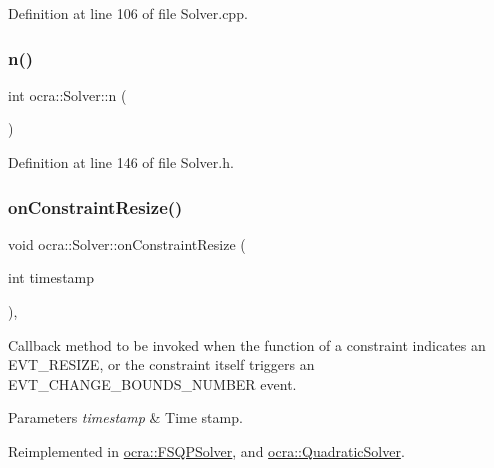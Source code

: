 Definition at line 106 of file Solver.\+cpp.

\hypertarget{classocra_1_1Solver_a63e73904de66df69372ed91c6b9d058b}{}\label{classocra_1_1Solver_a63e73904de66df69372ed91c6b9d058b} 
\subsubsection{\texorpdfstring{n()}{n()}}
{\footnotesize\ttfamily int ocra\+::\+Solver\+::n (\begin{DoxyParamCaption}{ }\end{DoxyParamCaption})\hspace{0.3cm}{\ttfamily [inline]}}



Definition at line 146 of file Solver.\+h.

\hypertarget{classocra_1_1Solver_ad74c2f36dcee107636675bb6ff16e26a}{}\label{classocra_1_1Solver_ad74c2f36dcee107636675bb6ff16e26a} 
\subsubsection{\texorpdfstring{on\+Constraint\+Resize()}{onConstraintResize()}}
{\footnotesize\ttfamily void ocra\+::\+Solver\+::on\+Constraint\+Resize (\begin{DoxyParamCaption}\item[{int}]{timestamp }\end{DoxyParamCaption})\hspace{0.3cm}{\ttfamily [protected]}, {\ttfamily [virtual]}}

Callback method to be invoked when the function of a constraint indicates an E\+V\+T\+\_\+\+R\+E\+S\+I\+ZE, or the constraint itself triggers an E\+V\+T\+\_\+\+C\+H\+A\+N\+G\+E\+\_\+\+B\+O\+U\+N\+D\+S\+\_\+\+N\+U\+M\+B\+ER event.


\begin{DoxyParams}{Parameters}
{\em timestamp} & Time stamp. \\
\hline
\end{DoxyParams}


Reimplemented in \hyperlink{classocra_1_1FSQPSolver_a4bee18cc63de9aabefe747e052662351}{ocra\+::\+F\+S\+Q\+P\+Solver}, and \hyperlink{classocra_1_1QuadraticSolver_aea64c3c099130835a5f42051921a0b6d}{ocra\+::\+Quadratic\+Solver}.




